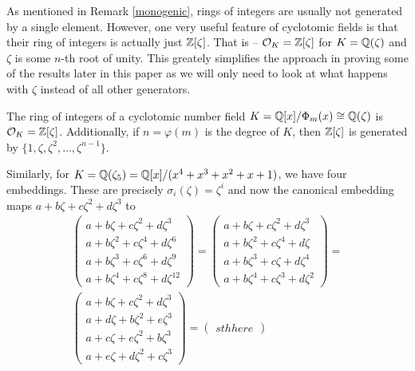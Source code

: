 As mentioned in Remark \ref{monogenic}, rings of integers are usually not generated by a single element. However, one very useful feature of cyclotomic fields is that their ring of integers is actually just $\mathbb{Z}[\zeta]$. That is -- $\mathcal{O}_K = \mathbb{Z}[\zeta]$ for $K = \mathbb{Q}(\zeta)$ and $\zeta$ is some $n$-th root of unity. This greately simplifies the approach in proving some of the results later in this paper as we will only need to look at what happens with $\zeta$ instead of all other generators.

\begin{proposition}\label{cycl-ok}
	The ring of integers of a cyclotomic number field $K = \mathbb{Q}[x]/\Phi_m(x) \cong \mathbb{Q}(\zeta)$ is $\mathcal{O}_K = \mathbb{Z}[\zeta]$. Additionally, if $n = \varphi(m)$ is the degree of $K$, then $\mathbb{Z}[\zeta]$ is generated by $\{1, \zeta, \zeta^2, \dots, \zeta^{n-1} \}$.
\end{proposition}

\begin{example}
		Similarly, for $K = \mathbb{Q}(\zeta_5) = \mathbb{Q}[x]/(x^4 +x^3 +x^2+x +1)$, we have four embeddings. These are precisely $\sigma_i(\zeta) = \zeta^i$ and now the canonical embedding maps $a + b\zeta + c\zeta^2 + d\zeta^3$ to
	\begin{align*}
		\begin{pmatrix}
		a + b\zeta + c\zeta^2 +d \zeta^3 \\
		a + b\zeta^2 + c\zeta^4 +d \zeta^6 \\
		a + b\zeta^3 + c\zeta^6 +d \zeta^9 \\
		a + b\zeta^4 + c\zeta^8 +d \zeta^{12}
		\end{pmatrix} = \begin{pmatrix}
		a + b\zeta + c\zeta^2 + d\zeta^3 \\
		a + b\zeta^2 + c\zeta^4 + d\zeta \\ 
		a + b\zeta^3 + c\zeta + d\zeta^4 \\
		a + b\zeta^4 + c\zeta^3 + d\zeta^2
		\end{pmatrix} = \\
		\begin{pmatrix}
		a + b\zeta + c\zeta^2 + d\zeta^3 \\
		a + d\zeta + b\zeta^2 + e\zeta^3 \\
		a + c\zeta + e\zeta^2 + b\zeta^3  \\
		a + e\zeta + d\zeta^2 + c\zeta^3 
		\end{pmatrix} = \begin{pmatrix} sth here
	\end{pmatrix}
	\end{align*}
\end{example}


